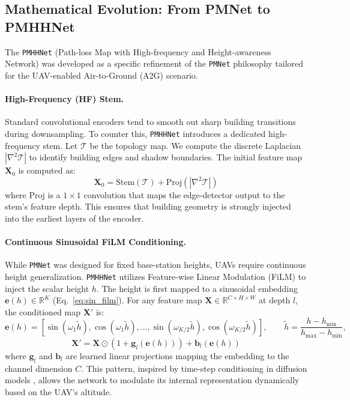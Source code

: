 \subsection{Mathematical Evolution: From PMNet to PMHHNet}

The \texttt{PMHHNet} (Path-loss Map with High-frequency and Height-awareness
Network) was developed as a specific refinement of the \texttt{PMNet}
philosophy tailored for the UAV-enabled Air-to-Ground (A2G) scenario.

\paragraph{High-Frequency (HF) Stem.}
Standard convolutional encoders tend to smooth out sharp building transitions
during downsampling. To counter this, \texttt{PMHHNet} introduces a dedicated
high-frequency stem. Let $\mathcal{T}$ be the topology map. We compute the
discrete Laplacian $|\nabla^2 \mathcal{T}|$ to identify building edges and
shadow boundaries. The initial feature map $\textbf{X}_0$ is computed as:
\begin{equation}
  \textbf{X}_0 = \mathrm{Stem}(\mathcal{T}) + \mathrm{Proj}(|\nabla^2 \mathcal{T}|)
  \label{eq:hf_stem}
\end{equation}
where $\mathrm{Proj}$ is a $1\times1$ convolution that maps the edge-detector
output to the stem's feature depth. This ensures that building geometry is
strongly injected into the earliest layers of the encoder.

\paragraph{Continuous Sinusoidal FiLM Conditioning.}
While \texttt{PMNet} was designed for fixed base-station heights, UAVs require
continuous height generalization. \texttt{PMHHNet} utilizes Feature-wise Linear
Modulation (FiLM) \cite{perez2018film} to inject the scalar height $h$.
The height is first mapped to a sinusoidal embedding $\textbf{e}(h) \in \mathbb{R}^K$
(Eq.~\ref{eq:sin_film}). For any feature map $\textbf{X} \in \mathbb{R}^{C \times H \times W}$
at depth $l$, the conditioned map $\textbf{X}'$ is:
\begin{equation}
  \textbf{e}(h)
  =
  \left[
    \sin(\omega_1 \tilde{h}), \cos(\omega_1 \tilde{h}), \ldots,
    \sin(\omega_{K/2} \tilde{h}), \cos(\omega_{K/2} \tilde{h})
  \right],
  \qquad
  \tilde{h} = \frac{h-h_{\min}}{h_{\max}-h_{\min}},
  \label{eq:sin_film}
\end{equation}
\begin{equation}
  \textbf{X}' = \textbf{X} \odot (1 + \textbf{g}_l(\textbf{e}(h))) + \textbf{b}_l(\textbf{e}(h))
  \label{eq:film_math}
\end{equation}
where $\textbf{g}_l$ and $\textbf{b}_l$ are learned linear projections mapping the
embedding to the channel dimension $C$. This pattern, inspired by time-step
conditioning in diffusion models \cite{dhariwal2021diffusion}, allows the
network to modulate its internal representation dynamically based on the UAV's
altitude.

